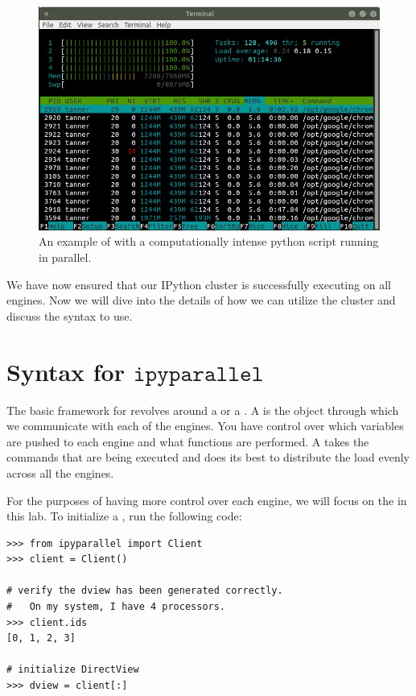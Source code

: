 \begin{figure}
    \includegraphics[width=\textwidth]{cluster_active.jpg}
\caption{An example of  with a computationally intense python script running in parallel.}
\label{fig:htop_cluster}
\end{figure}

We have now ensured that our IPython cluster is successfully executing on all engines. Now we will dive into the details of how we can utilize the cluster and discuss the syntax to use.

\section*{Syntax for $\texttt{ipyparallel}$}
The basic framework for  revolves around a  or a .
A  is the object through which we communicate with each of the engines. You have control over which variables are pushed to each engine and what functions are performed. A  takes the commands that are being executed and does its best to distribute the load evenly across all the engines.

For the purposes of having more control over each engine, we will focus on the  in this lab. To initialize a , run the following code:

\begin{lstlisting}
>>> from ipyparallel import Client
>>> client = Client()

# verify the dview has been generated correctly.
#   On my system, I have 4 processors.
>>> client.ids
[0, 1, 2, 3]

# initialize DirectView
>>> dview = client[:]
\end{lstlisting}

